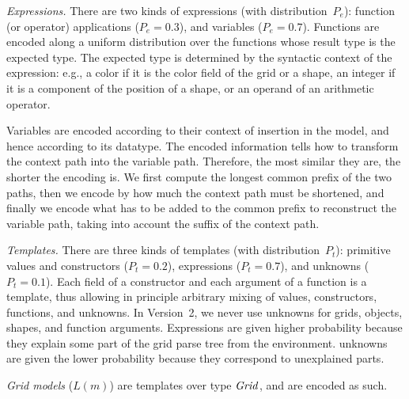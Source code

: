\documentclass[a4paper]{llncs}
\newcommand{\KILL}[1]{}
\begin{document}
{\em Expressions.} There are two kinds of expressions (with
distribution~$P_e$): function (or operator) applications
($P_e = 0.3$), and variables ($P_e = 0.7$). Functions are encoded
along a uniform distribution over the functions whose result type is
the expected type. The expected type is determined by the syntactic
context of the expression: e.g., a color if it is the color field of
the grid or a shape, an integer if it is a component of the position
of a shape, or an operand of an arithmetic operator.
%
\KILL{Version 2.2: Variables are encoded according to the environment signature, i.e. the
set of variables that are available in the environment, grouped by
data type. A variable is encoded according to a probability
distribution over the environment variables of same type. In order to
distinguish between the same-type variables, we define the probability
distribution as the softmax of the similarities between the paths of
those variables with the expression path. This implies that defining a
shape height as a function of a shape height is prefered to defining
it as a function of a shape width or a shape position.}
%
Variables are encoded according to their context of insertion in the
model, and hence according to its datatype. The encoded information
tells how to transform the context path into the variable
path. Therefore, the most similar they are, the shorter the encoding
is. We first compute the longest common prefix of the two paths, then
we encode by how much the context path must be shortened, and finally
we encode what has to be added to the common prefix to reconstruct the
variable path, taking into account the suffix of the context path.

{\em Templates.} There are three kinds of templates (with
distribution~$P_t$): primitive values and constructors ($P_t = 0.2$),
expressions ($P_t = 0.7$), and unknowns ($P_t = 0.1$). Each field of a
constructor and each argument of a function is a template, thus
allowing in principle arbitrary mixing of values, constructors,
functions, and unknowns. In Version~2, we never use unknowns for
grids, objects, shapes, and function arguments. Expressions are given
higher probability because they explain some part of the grid parse
tree from the environment. unknowns are given the lower probability
because they correspond to unexplained parts.

{\em Grid models} ($L(m)$) are templates over type ${\it Grid}$,
and are encoded as such.
\end{document}
